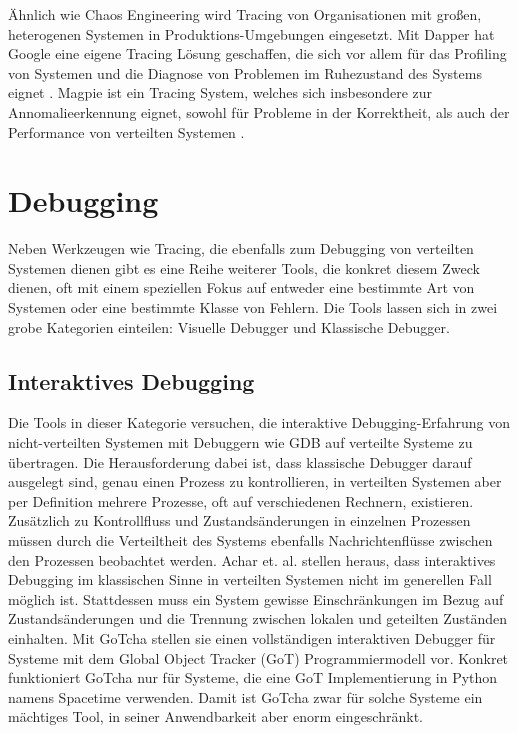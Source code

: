 \documentclass[12pt,a4paper]{report}
\begin{document}
Ähnlich wie Chaos Engineering wird Tracing von Organisationen mit großen, heterogenen Systemen in Produktions-Umgebungen
eingesetzt. Mit Dapper \cite{dapper_tracing} hat Google eine eigene Tracing Lösung geschaffen, die sich vor allem für das
Profiling von Systemen und die Diagnose von Problemen im Ruhezustand des Systems eignet \cite{so_you_want_to_trace}. Magpie
\cite{magpie_tracing} ist ein Tracing System, welches sich insbesondere zur Annomalieerkennung eignet, sowohl für Probleme in der
Korrektheit, als auch der Performance von verteilten Systemen \cite{so_you_want_to_trace}.

\section{Debugging}
Neben Werkzeugen wie Tracing, die ebenfalls zum Debugging von verteilten Systemen dienen gibt es eine Reihe weiterer Tools, die
konkret diesem Zweck dienen, oft mit einem speziellen Fokus auf entweder eine bestimmte Art von Systemen oder eine bestimmte
Klasse von Fehlern. Die Tools lassen sich in zwei grobe Kategorien einteilen: Visuelle Debugger und Klassische Debugger.

\subsection{Interaktives Debugging}
Die Tools in dieser Kategorie versuchen, die interaktive Debugging-Erfahrung von nicht-verteilten Systemen mit Debuggern wie GDB auf verteilte
Systeme zu übertragen. Die Herausforderung dabei ist, dass klassische Debugger darauf ausgelegt sind, genau einen Prozess
zu kontrollieren, in verteilten Systemen aber per Definition mehrere Prozesse, oft auf verschiedenen Rechnern, existieren.
Zusätzlich zu Kontrollfluss und Zustandsänderungen in einzelnen Prozessen müssen durch die Verteiltheit des Systems ebenfalls
Nachrichtenflüsse zwischen den Prozessen beobachtet werden. Achar et. al. \cite{gotcha_interactive_debugger} stellen heraus, dass
interaktives Debugging im klassischen Sinne in verteilten Systemen nicht im generellen Fall möglich ist. Stattdessen muss ein
System gewisse Einschränkungen im Bezug auf Zustandsänderungen und die Trennung zwischen lokalen und geteilten Zuständen
einhalten. Mit GoTcha \cite{gotcha_interactive_debugger} stellen sie einen vollständigen interaktiven Debugger für Systeme mit dem
Global Object Tracker (GoT) Programmiermodell vor. Konkret funktioniert GoTcha nur für Systeme, die eine GoT Implementierung in
Python namens Spacetime verwenden. Damit ist GoTcha zwar für solche Systeme ein mächtiges Tool, in seiner Anwendbarkeit aber enorm
eingeschränkt.
\end{document}
